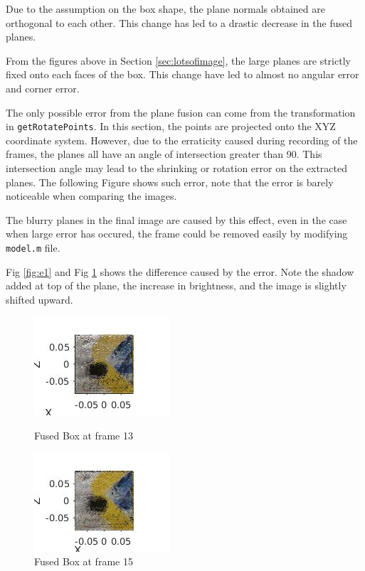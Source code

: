 \documentclass[10pt,a4paper]{article}
\begin{document}
Due to the assumption on the box shape, the plane normals obtained are orthogonal to each other.
This change has led to a drastic decrease in the fused planes.

From the figures above in Section \ref{sec:lotsofimage}, the large planes are strictly fixed onto each faces of the box. 
This change have led to almost no angular error and corner error.

The only possible error from the plane fusion can come from the transformation in {\tt getRotatePoints}. 
In this section, the points are projected onto the XYZ coordinate system.
However, due to the erraticity caused during recording of the frames, the planes all have an angle of intersection greater than 90.
This intersection angle may lead to the shrinking or rotation error on the extracted planes.
The following Figure shows such error, note that the error is barely noticeable when comparing the images. 

The blurry planes in the final image are caused by this effect, even in the case when large error has occured, the frame could be removed easily by modifying {\tt model.m} file.

Fig \ref{fig:e1} and Fig \ref{fig:e2} shows the difference caused by the error.
Note the shadow added at top of the plane, the increase in brightness, and the image is slightly shifted upward.

\vspace{-10pt}
\hspace{-40pt}
\begin{figure}[!h]
	\begin{minipage}[t]{0.5 \linewidth}
		
		\centering
		\includegraphics[scale=0.5]{planeerror13.jpg}
		\caption{ \small Fused Box at frame 13}
		\label{fig:e1}
	\end{minipage}
	\begin{minipage}[t]{0.5 \linewidth}
		\centering
		\includegraphics[scale=0.5]{planeerror15.jpg}
		\caption{ \small Fused Box at frame 15}
		\label{fig:e2}
	\end{minipage}
\end{figure}
\end{document}
